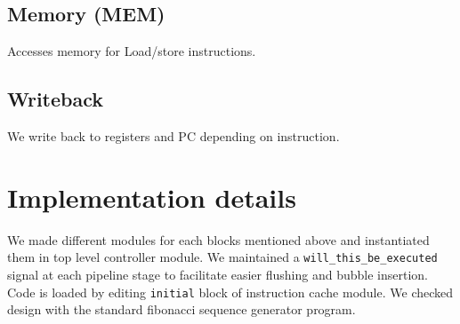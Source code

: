 \documentclass[a4paper]{article}
\begin{document}
	\subsection{Memory (MEM)} 
		Accesses memory for Load/store instructions.

	\subsection{Writeback} 
		We write back to registers and PC depending on instruction.

\section{Implementation details}

We made different modules for each blocks mentioned above and instantiated them in top level controller module. We maintained a \texttt{will\_this\_be\_executed} signal at each pipeline stage to facilitate easier flushing and bubble insertion. Code is loaded by editing \texttt{initial} block of instruction cache module. We checked design with the standard fibonacci sequence generator program.
\end{document}
